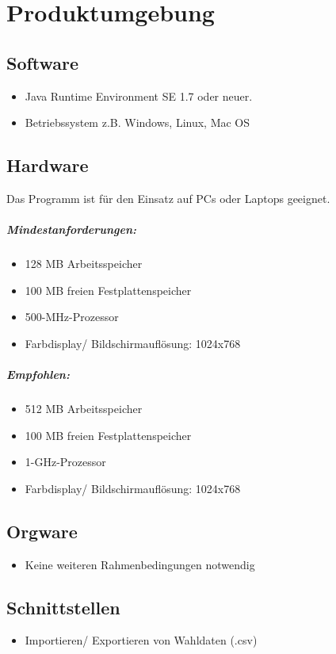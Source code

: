 \documentclass[10pt,a4paper]{article}
\begin{document}
\section{Produktumgebung}
\subsection{Software}
\begin{itemize}
\item Java Runtime Environment SE 1.7 oder neuer.
\item Betriebssystem z.B. Windows, Linux, Mac OS
\end{itemize}


\subsection{Hardware}
Das Programm ist für den Einsatz auf PCs oder Laptops geeignet.
\subparagraph{Mindestanforderungen:}
\begin{itemize}
\item 128 MB Arbeitsspeicher
\item 100 MB freien Festplattenspeicher
\item 500-MHz-Prozessor
\item Farbdisplay/ Bildschirmauflösung: 1024x768
\end{itemize}

\subparagraph{Empfohlen:}
\begin{itemize}
\item 512 MB Arbeitsspeicher
\item 100 MB freien Festplattenspeicher
\item 1-GHz-Prozessor
\item Farbdisplay/ Bildschirmauflösung: 1024x768
\end{itemize}


\subsection{Orgware}
\begin{itemize}
\item Keine weiteren Rahmenbedingungen notwendig
\end{itemize}


\subsection{Schnittstellen}
\begin{itemize}
\item Importieren/ Exportieren von Wahldaten (.csv)
\end{itemize}
\end{document}
